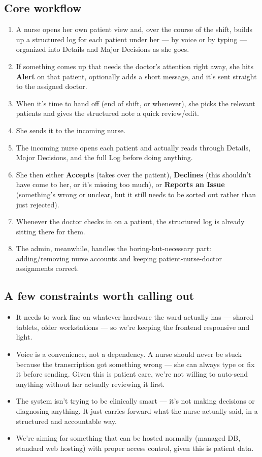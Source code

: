 \documentclass[11pt,a4paper]{article}
\begin{document}
\subsection{Core workflow}
\begin{enumerate}[leftmargin=0.7cm]
    \item A nurse opens her own patient view and, over the course of the shift, builds up a structured log for each patient under her --- by voice or by typing --- organized into Details and Major Decisions as she goes.
    \item If something comes up that needs the doctor's attention right away, she hits \textbf{Alert} on that patient, optionally adds a short message, and it's sent straight to the assigned doctor.
    \item When it's time to hand off (end of shift, or whenever), she picks the relevant patients and gives the structured note a quick review/edit.
    \item She sends it to the incoming nurse.
    \item The incoming nurse opens each patient and actually reads through Details, Major Decisions, and the full Log before doing anything.
    \item She then either \textbf{Accepts} (takes over the patient), \textbf{Declines} (this shouldn't have come to her, or it's missing too much), or \textbf{Reports an Issue} (something's wrong or unclear, but it still needs to be sorted out rather than just rejected).
    \item Whenever the doctor checks in on a patient, the structured log is already sitting there for them.
    \item The admin, meanwhile, handles the boring-but-necessary part: adding/removing nurse accounts and keeping patient-nurse-doctor assignments correct.
\end{enumerate}

\subsection{A few constraints worth calling out}
\begin{itemize}[leftmargin=0.7cm]
    \item It needs to work fine on whatever hardware the ward actually has --- shared tablets, older workstations --- so we're keeping the frontend responsive and light.
    \item Voice is a convenience, not a dependency. A nurse should never be stuck because the transcription got something wrong --- she can always type or fix it before sending. Given this is patient care, we're not willing to auto-send anything without her actually reviewing it first.
    \item The system isn't trying to be clinically smart --- it's not making decisions or diagnosing anything. It just carries forward what the nurse actually said, in a structured and accountable way.
    \item We're aiming for something that can be hosted normally (managed DB, standard web hosting) with proper access control, given this is patient data.
\end{itemize}
\end{document}
